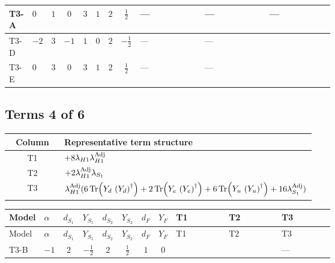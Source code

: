 \documentclass[8pt]{article}
\begin{document}
\begin{landscape}
\begin{longtable}{@{}llcccccc >{\raggedright\arraybackslash}p{0.21\linewidth} >{\raggedright\arraybackslash}p{0.21\linewidth} >{\raggedright\arraybackslash}p{0.21\linewidth}@{}}
\midrule
T3-A & $0$ & $1$ & $0$ & $3$ & $1$ & $2$ & $\frac{1}{2}$ & --- & --- & --- \\
\midrule
T3-D & $-2$ & $3$ & $-1$ & $1$ & $0$ & $2$ & $-\frac{1}{2}$ & --- & --- & \scriptsize\adjustbox{max width=\linewidth}{$\begin{gathered} +2 {\lambda_H} {\lambda_{H1}^{\rm Adj}}\end{gathered}$} \\
\midrule
T3-E & $0$ & $3$ & $0$ & $3$ & $1$ & $2$ & $\frac{1}{2}$ & --- & --- & \scriptsize\adjustbox{max width=\linewidth}{$\begin{gathered} +2 {\lambda_H} {\lambda_{H1}^{\rm Adj}}\end{gathered}$} \\
\midrule
\bottomrule
\end{longtable}
\clearpage
\subsection*{Terms 4 of 6}
\begin{center}
\begin{tabular}{@{}c >{\raggedright\arraybackslash}p{0.82\linewidth}@{}}
\toprule
Column & Representative term structure \\
\midrule
T1 & \(\displaystyle +8 {\lambda_{H1}} {\lambda_{H1}^{\rm Adj}}\) \\
\midrule
T2 & \(\displaystyle +2 {\lambda_{H1}^{\rm Adj}} {\lambda_{S_1}}\) \\
\midrule
T3 & \(\displaystyle {\lambda_{H1}^{\rm Adj}} (6 \operatorname{Tr}\!\left({Y_d}\,\left({Y_d}\right)^{\dagger}\right)+2 \operatorname{Tr}\!\left({Y_e}\,\left({Y_e}\right)^{\dagger}\right)+6 \operatorname{Tr}\!\left({Y_u}\,\left({Y_u}\right)^{\dagger}\right)+16 {\lambda_{S_1}^{\rm Adj}})\) \\
\midrule
\bottomrule
\end{tabular}
\end{center}
\smallskip
\tiny
\begin{longtable}{@{}llcccccc >{\raggedright\arraybackslash}p{0.21\linewidth} >{\raggedright\arraybackslash}p{0.21\linewidth} >{\raggedright\arraybackslash}p{0.21\linewidth}@{}}
\toprule
Model & $\alpha$ & $d_{S_1}$ & $Y_{S_1}$ & $d_{S_2}$ & $Y_{S_2}$ & $d_F$ & $Y_F$ & T1 & T2 & T3 \\
\midrule
\endfirsthead
\toprule
Model & $\alpha$ & $d_{S_1}$ & $Y_{S_1}$ & $d_{S_2}$ & $Y_{S_2}$ & $d_F$ & $Y_F$ & T1 & T2 & T3 \\
\midrule
\endhead
T3-B & $-1$ & $2$ & $-\frac{1}{2}$ & $2$ & $\frac{1}{2}$ & $1$ & $0$ & \scriptsize\adjustbox{max width=\linewidth}{$\begin{gathered} +8 {\lambda_{H1}} {\lambda_{H1}^{\rm Adj}}\end{gathered}$} & \scriptsize\adjustbox{max width=\linewidth}{$\begin{gathered} +2 {\lambda_{H1}^{\rm Adj}} {\lambda_{S_1}}\end{gathered}$} & --- \\

\end{longtable}
\end{landscape}
\end{document}
